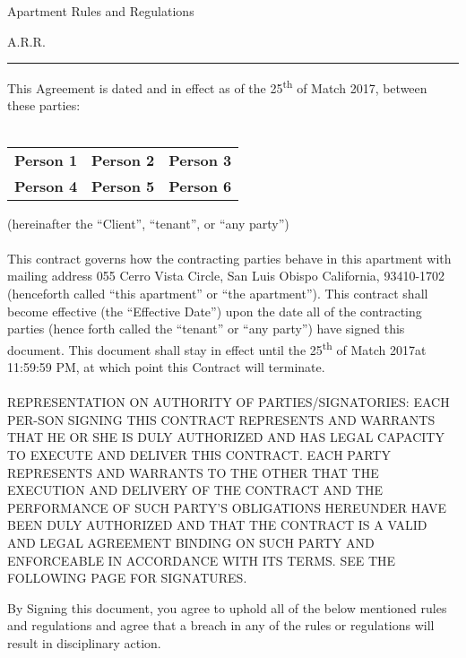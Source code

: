 \documentclass[10pt]{article}
\newcommand{\dateEffective}{25\textsuperscript {th} of Match 2017}
\newcommand{\dateNullification}{25\textsuperscript {th} of Match 2017}
\newcommand{\personOne}{Person 1}
\newcommand{\personTwo}{Person 2}
\newcommand{\personThree}{Person 3}
\newcommand{\personFour}{Person 4}
\newcommand{\personFive}{Person 5}
\newcommand{\personSix}{Person 6}
\begin{document}
	\begin{center}
		{\Large Apartment Rules and Regulations}
	\end{center}
\begin{center}
	
	{\normalsize  A.R.R.}
\end{center}
\hrule height .1mm

\vspace{.5cm}

\noindent This Agreement is dated and in effect as of the \dateEffective, between these parties:\\
\\
\begin{center}
	\begin{tabular}{ c c c }
		{\bf \personOne} & {\bf \personTwo} & {\bf \personThree}\\
		{\bf {\bf \personFour}} & {\bf \personFive} & {\bf \personSix}
	\end{tabular}
\end{center}

\noindent (hereinafter the ``Client'', ``tenant'', or ``any party'')\\ \\

\noindent This contract governs how the contracting parties behave in this apartment with mailing address 055 Cerro Vista Circle, San Luis Obispo California, 93410-1702 (henceforth called ``this apartment'' or ``the apartment''). This contract shall become effective (the ``Effective Date'') upon the date all of the contracting parties (hence forth called the ``tenant'' or ``any party'') have signed this document. This document shall stay in effect until the \dateNullification\space at 11:59:59 PM, at which point this Contract will terminate.
\\ \\
\noindent REPRESENTATION ON AUTHORITY OF PARTIES/SIGNATORIES: EACH PER-SON SIGNING THIS CONTRACT REPRESENTS AND WARRANTS THAT HE OR SHE IS DULY AUTHORIZED AND HAS LEGAL CAPACITY TO EXECUTE AND DELIVER THIS CONTRACT. EACH PARTY REPRESENTS AND WARRANTS TO THE OTHER THAT THE EXECUTION AND DELIVERY OF THE CONTRACT AND THE PERFORMANCE OF SUCH PARTY’S OBLIGATIONS HEREUNDER HAVE BEEN DULY AUTHORIZED AND THAT THE CONTRACT IS A VALID AND LEGAL AGREEMENT BINDING ON SUCH PARTY AND ENFORCEABLE IN ACCORDANCE WITH ITS TERMS. SEE THE FOLLOWING PAGE FOR SIGNATURES.

\newpage
\noindent By Signing this document, you agree to uphold all of the below mentioned rules and regulations and agree that a breach in any of the rules or regulations will result in disciplinary action.
\def\s#1#2{\vbox{\hsize=4.5cm
		\kern2cm
		\hrule\kern1ex
		\hbox to \hsize{\strut\hfil #1 \hfil}
		\hbox to \hsize{\strut\hfil #2 \hfil}}}
\end{document}
